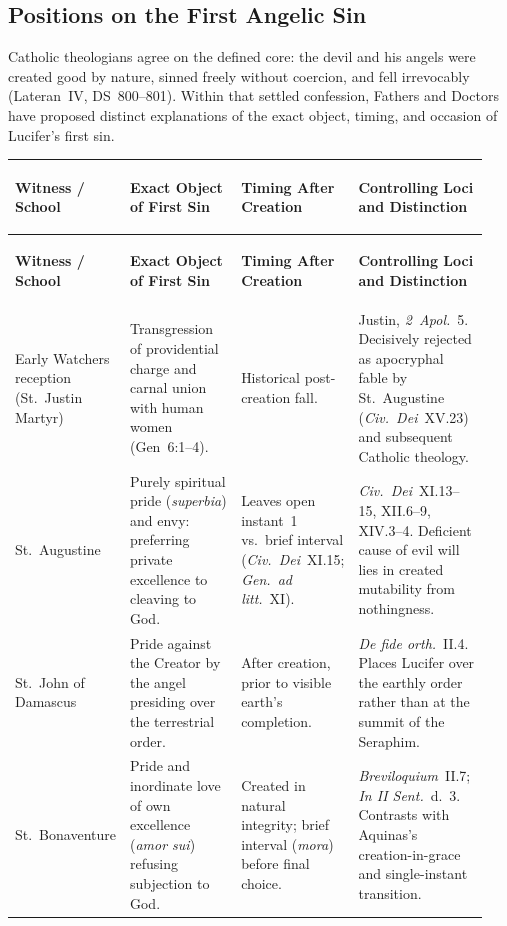 \subsection{Positions on the First Angelic Sin}

Catholic theologians agree on the defined core: the devil and his angels were created good by nature, sinned freely without coercion, and fell irrevocably (Lateran~IV, DS~800--801). Within that settled confession, Fathers and Doctors have proposed distinct explanations of the exact object, timing, and occasion of Lucifer's first sin.

{\footnotesize
\setlength{\tabcolsep}{2.5pt}
\renewcommand{\arraystretch}{1.15}
\begin{longtable}{>{\bfseries\raggedright\arraybackslash}p{0.19\linewidth}>{\raggedright\arraybackslash}p{0.25\linewidth}>{\raggedright\arraybackslash}p{0.22\linewidth}>{\raggedright\arraybackslash}p{0.28\linewidth}}
\toprule
\textbf{Witness / School} & \textbf{Exact Object of First Sin} & \textbf{Timing After Creation} & \textbf{Controlling Loci and Distinction} \\
\midrule
\endfirsthead
\toprule
\textbf{Witness / School} & \textbf{Exact Object of First Sin} & \textbf{Timing After Creation} & \textbf{Controlling Loci and Distinction} \\
\midrule
\endhead
\bottomrule
\endfoot
Early Watchers reception (St.~Justin Martyr) & Transgression of providential charge and carnal union with human women (Gen~6:1--4). & Historical post-creation fall. & Justin, \emph{2~Apol.}~5. Decisively rejected as apocryphal fable by St.~Augustine (\emph{Civ.\ Dei}~XV.23) and subsequent Catholic theology. \\
\addlinespace[2pt]
St.~Augustine & Purely spiritual pride (\emph{superbia}) and envy: preferring private excellence to cleaving to God. & Leaves open instant~1 vs.\ brief interval (\emph{Civ.\ Dei}~XI.15; \emph{Gen.\ ad litt.}~XI). & \emph{Civ.\ Dei}~XI.13--15, XII.6--9, XIV.3--4. Deficient cause of evil will lies in created mutability from nothingness. \\
\addlinespace[2pt]
St.~John of Damascus & Pride against the Creator by the angel presiding over the terrestrial order. & After creation, prior to visible earth's completion. & \emph{De fide orth.}~II.4. Places Lucifer over the earthly order rather than at the summit of the Seraphim. \\
\addlinespace[2pt]
St.~Bonaventure & Pride and inordinate love of own excellence (\emph{amor sui}) refusing subjection to God. & Created in natural integrity; brief interval (\emph{mora}) before final choice. & \emph{Breviloquium}~II.7; \emph{In II Sent.}~d.~3. Contrasts with Aquinas's creation-in-grace and single-instant transition. \\

\end{longtable}}
